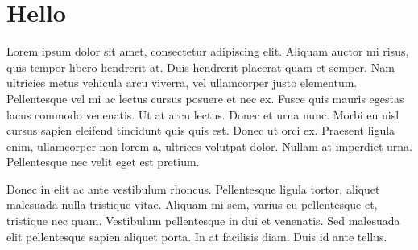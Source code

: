 \documentclass[
	a4paper, %
	11pt, %
]{DC_Report}
\begin{document}
\newpage


\begin{twothirdswidth} %
	\tableofcontents %
\end{twothirdswidth}

\newpage


\section{Hello } %

Lorem ipsum dolor sit amet, consectetur adipiscing elit. Aliquam auctor mi risus, quis tempor libero hendrerit at. Duis hendrerit placerat quam et semper. Nam ultricies metus vehicula arcu viverra, vel ullamcorper justo elementum. Pellentesque vel mi ac lectus cursus posuere et nec ex. Fusce quis mauris egestas lacus commodo venenatis. Ut at arcu lectus. Donec et urna nunc. Morbi eu nisl cursus sapien eleifend tincidunt quis quis est. Donec ut orci ex. Praesent ligula enim, ullamcorper non lorem a, ultrices volutpat dolor. Nullam at imperdiet urna. Pellentesque nec velit eget est pretium.

Donec in elit ac ante vestibulum rhoncus. Pellentesque ligula tortor, aliquet malesuada nulla tristique vitae. Aliquam mi sem, varius eu pellentesque et, tristique nec quam. Vestibulum pellentesque in dui et venenatis. Sed malesuada elit pellentesque sapien aliquet porta. In at facilisis diam. Duis id ante tellus. %
\end{document}
